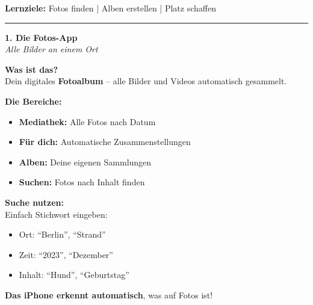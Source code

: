 \documentclass[a4paper,landscape,8pt]{extarticle}
\begin{document}

 \hfill
{\footnotesize\textbf{Lernziele:} Fotos finden | Alben erstellen | Platz schaffen}

\vspace{1mm}
\hrule
\vspace{1mm}

\begin{minipage}[t]{0.32\linewidth}
\begin{center}
\colorbox{photopink!15}{%
\begin{minipage}{0.95\linewidth}
\vspace{2mm}
\begin{center}
{\Large\bfseries\textcolor{photopink}{1. Die Fotos-App}}\\[1pt]
{\footnotesize\itshape Alle Bilder an einem Ort}
\end{center}
\vspace{2mm}
\end{minipage}%
}
\end{center}

\vspace{1mm}

\textbf{Was ist das?}\\
Dein digitales \textbf{Fotoalbum} -- alle Bilder und Videos automatisch gesammelt.

\textbf{Die Bereiche:}
\begin{itemize}
\item \textbf{Mediathek:} Alle Fotos nach Datum
\item \textbf{Für dich:} Automatische Zusammenstellungen
\item \textbf{Alben:} Deine eigenen Sammlungen
\item \textbf{Suchen:} Fotos nach Inhalt finden
\end{itemize}

\textbf{Suche nutzen:}\\
Einfach Stichwort eingeben:
\begin{itemize}
\item Ort: ``Berlin'', ``Strand''
\item Zeit: ``2023'', ``Dezember''
\item Inhalt: ``Hund'', ``Geburtstag''
\end{itemize}

\textbf{Das iPhone erkennt automatisch}, was auf Fotos ist!

\end{minipage}%
\end{document}
